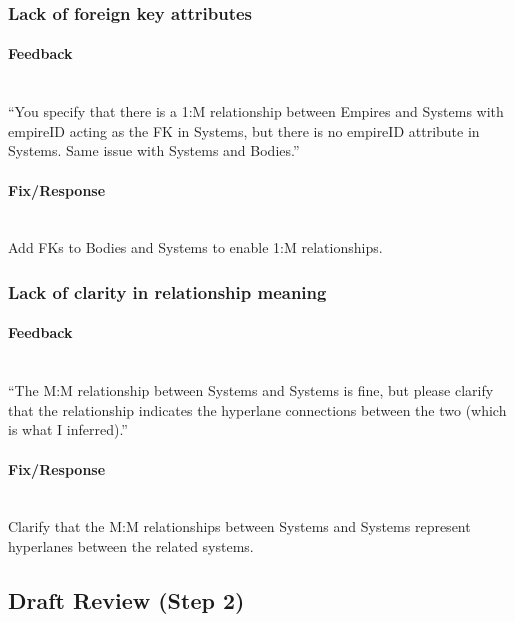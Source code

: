 \documentclass[12pt]{article}
\newcommand{\hparagraph}[1]{\paragraph{#1}\mbox{}\vspace{0.75em}\\}
\begin{document}
\begin{appendices}
\subsubsection{Lack of foreign key attributes}
\hparagraph{Feedback}
“You specify that there is a 1:M relationship between Empires and Systems with empireID acting as the FK in Systems, but there is no empireID attribute in Systems. Same issue with Systems and Bodies.”
\hparagraph{Fix/Response}
Add FKs to Bodies and Systems to enable 1:M relationships.

\subsubsection{Lack of clarity in relationship meaning}
\hparagraph{Feedback}
“The M:M relationship between Systems and Systems is fine, but please clarify that the relationship indicates the hyperlane connections between the two (which is what I inferred).”
\hparagraph{Fix/Response}
Clarify that the M:M relationships between Systems and Systems represent hyperlanes between the related systems.

\newpage
\subsection{Draft Review (Step 2)}

\end{appendices}
\end{document}

